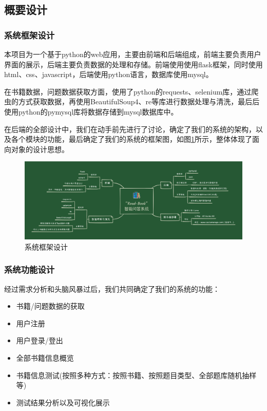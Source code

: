 \documentclass[twoside,11pt]{article}
\begin{document}
\subsection{概要设计}
\subsubsection{系统框架设计}

本项目为一个基于python的web应用，主要由前端和后端组成，前端主要负责用户界面的展示，后端主要负责数据的处理和存储。前端使用使用flask框架，同时使用html、css、javascript，后端使用python语言，数据库使用mysql。

在书籍数据，问题数据获取方面，使用了python的requests、selenium库，通过爬虫的方式获取数据，再使用BeautifulSoup4、re等库进行数据处理与清洗，最后后使用python的pymysql库将数据存储到mysql数据库中。

在后端的全部设计中，我们在动手前先进行了讨论，确定了我们的系统的架构，以及各个模块的功能，最后确定了我们的系统的框架图，如图\ref{fig:fig1}所示，整体体现了面向对象的设计思想。

\begin{figure}[H]
    \centering
    \includegraphics[width=1\columnwidth]{figures/系统框架设计.jpg}
    \caption{系统框架设计}
    \label{fig:fig1}
\end{figure}
\subsubsection{系统功能设计}

经过需求分析和头脑风暴过后，我们共同确定了我们的系统的功能：
\begin{itemize}
    \item 书籍/问题数据的获取
    \item 用户注册
    \item 用户登录/登出
    \item 全部书籍信息概览
    \item 书籍信息测试(按照多种方式：按照书籍、按照题目类型、全部题库随机抽样等)
    \item 测试结果分析以及可视化展示
\end{itemize}
\end{document}
